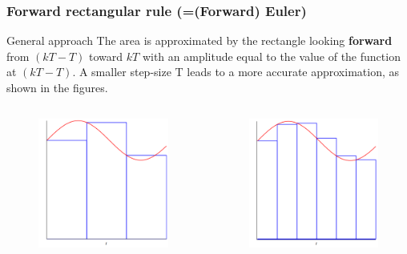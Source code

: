 \begin{frame}
	\frametitle{Forward rectangular rule (=(Forward) Euler)}

	\begin{block}{General approach}
		The area is approximated by the rectangle looking \textbf{forward} from $(kT - T)$ toward $kT$ with an amplitude equal to the value of the function at $(kT - T)$. A smaller step-size T leads to a more accurate approximation, as shown in the figures.
	\end{block}

\begin{columns}
	\begin{column}{0.5\textwidth}
		\begin{figure}
			\centering
			\includegraphics[width=0.6\linewidth]{Forward1}
		\end{figure}
	\end{column}
	
	\begin{column}{0.5\textwidth}
		\begin{figure}
			\centering
			\includegraphics[width=0.6\linewidth]{Forward2}
		\end{figure}
	\end{column}
\end{columns}
\end{frame}

